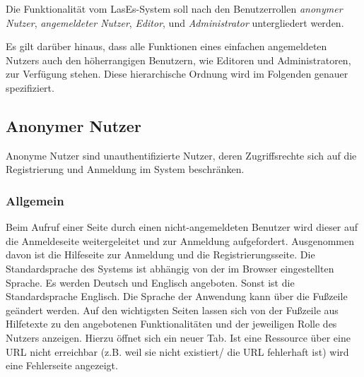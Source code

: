 
Die Funktionalität vom LasEs-System soll nach den Benutzerrollen
\textit{anonymer Nutzer}, \textit{angemeldeter Nutzer}, \textit{Editor}, und
\textit{Administrator} untergliedert werden.

Es gilt darüber hinaus, dass alle Funktionen eines einfachen angemeldeten Nutzers auch den höherrangigen Benutzern, wie Editoren und Administratoren, zur Verfügung stehen. Diese hierarchische Ordnung wird im Folgenden genauer spezifiziert.

\subsection{Anonymer Nutzer}
Anonyme Nutzer sind unauthentifizierte Nutzer, deren Zugriffsrechte sich
auf die Registrierung und Anmeldung im System beschränken.

\subsubsection{Allgemein}
\begin{description}
     Beim Aufruf einer Seite durch einen nicht-angemeldeten Benutzer
    wird dieser auf die Anmeldeseite weitergeleitet und zur
    Anmeldung aufgefordert. Ausgenommen davon ist die Hilfeseite zur Anmeldung und die
    Registrierungsseite.
     Die Standardsprache des Systems ist abhängig von der im Browser
    eingestellten Sprache. Es werden Deutsch und Englisch angeboten.
    Sonst ist die Standardsprache Englisch. Die Sprache der Anwendung kann über die
    Fußzeile geändert werden.
     Auf den wichtigsten Seiten lassen sich von der Fußzeile aus
    Hilfetexte zu den angebotenen Funktionalitäten und der jeweiligen Rolle
    des Nutzers anzeigen. Hierzu öffnet sich ein neuer Tab.
     Ist eine Ressource über eine URL nicht erreichbar (z.B. weil sie nicht existiert/
     die URL fehlerhaft ist) wird eine Fehlerseite angezeigt.%
\end{description}

